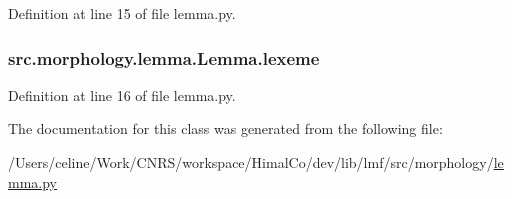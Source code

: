 Definition at line 15 of file lemma.\+py.

\hypertarget{classsrc_1_1morphology_1_1lemma_1_1_lemma_a7748c9b434cf254c617934fe550138bb}{
\subsubsection[{lexeme}]{\setlength{\rightskip}{0pt plus 5cm}src.\+morphology.\+lemma.\+Lemma.\+lexeme}}\label{classsrc_1_1morphology_1_1lemma_1_1_lemma_a7748c9b434cf254c617934fe550138bb}


Definition at line 16 of file lemma.\+py.



The documentation for this class was generated from the following file\+:\begin{DoxyCompactItemize}
\item 
/\+Users/celine/\+Work/\+C\+N\+R\+S/workspace/\+Himal\+Co/dev/lib/lmf/src/morphology/\hyperlink{lemma_8py}{lemma.\+py}\end{DoxyCompactItemize}
